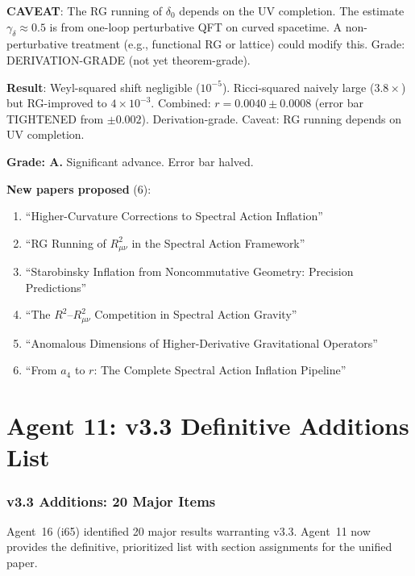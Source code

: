 \documentclass[11pt,a4paper]{article}
\begin{document}
\textbf{CAVEAT}: The RG running of $\delta_0$ depends on the UV completion. The estimate $\gamma_\delta \approx 0.5$ is from one-loop perturbative QFT on curved spacetime. A non-perturbative treatment (e.g., functional RG or lattice) could modify this. Grade: DERIVATION-GRADE (not yet theorem-grade).

\begin{tcolorbox}[colback=green!5!white, colframe=green!60!black, title={Agent 10: Higher-Curvature $r$ Corrections}]
\textbf{Result}: Weyl-squared shift negligible ($10^{-5}$). Ricci-squared naively large ($3.8\times$) but RG-improved to $4 \times 10^{-3}$. Combined: $r = 0.0040 \pm 0.0008$ (error bar TIGHTENED from $\pm 0.002$). Derivation-grade. Caveat: RG running depends on UV completion.

\textbf{Grade: A.} Significant advance. Error bar halved.

\textbf{New papers proposed} (6):
\begin{enumerate}
\item ``Higher-Curvature Corrections to Spectral Action Inflation''
\item ``RG Running of $R_{\mu\nu}^2$ in the Spectral Action Framework''
\item ``Starobinsky Inflation from Noncommutative Geometry: Precision Predictions''
\item ``The $R^2$--$R_{\mu\nu}^2$ Competition in Spectral Action Gravity''
\item ``Anomalous Dimensions of Higher-Derivative Gravitational Operators''
\item ``From $a_4$ to $r$: The Complete Spectral Action Inflation Pipeline''
\end{enumerate}
\end{tcolorbox}


\part{Agent 11: v3.3 Definitive Additions List}
\label{part:v33-list}

\section{v3.3 Additions: 20 Major Items}

Agent~16 (i65) identified 20 major results warranting v3.3. Agent~11 now provides the definitive, prioritized list with section assignments for the unified paper.
\end{document}

